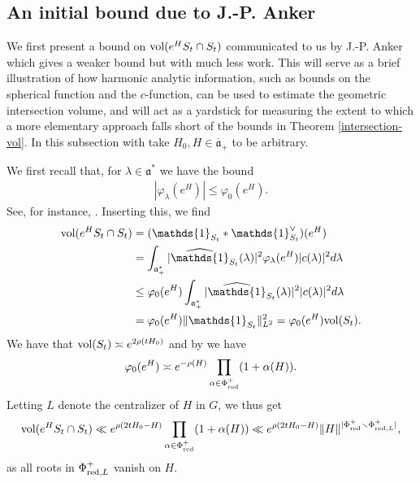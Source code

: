 \documentclass[12pt]{amsart}
\theoremstyle{remark}
\newcommand{\ga}{\mathfrak a}
\begin{document}
\subsection{An initial bound due to J.-P. Anker} \label{sub_sec_anker}
We first present a bound on $\textnormal{vol}(e^H S_t \cap S_t)$ communicated to us by J.-P. Anker which gives a weaker bound but with much less work. This will serve as a brief illustration of how harmonic analytic information, such as bounds on the spherical function and the $c$-function, can be used to estimate the geometric intersection volume, and will act as a yardstick for measuring the extent to which a more elementary approach falls short of the bounds in Theorem \ref{intersection-vol}. In this subsection with take $H_0, H \in \overline{\ga}_+$ to be arbitrary. 

We first recall that, for $\lambda \in \mathfrak{a^*}$ we have the bound
\begin{gather*}
    |\varphi_\lambda(e^H)| \leq \varphi_0(e^H). 
\end{gather*}
See, for instance, \cite[Prop. 4.6.1]{Gangolli_Varadarajan_88}. Inserting this, we find
\begin{align*}
    \textnormal{vol}(e^H S_t \cap S_t) &= (\mathds{1}_{S_t} * \mathds{1}_{S_t}^\vee)(e^H) \\
    &= \int_{\ga_+^*} |\widehat{\mathds{1}}_{S_t}(\lambda)|^2 \varphi_\lambda(e^H) |c(\lambda)|^2 d \lambda \\
    & \leq \varphi_0(e^H) \int_{\ga_+^{*}} |\widehat{\mathds{1}}_{S_t}(\lambda)|^2 |c(\lambda)|^2 d \lambda \\
    & = \varphi_0(e^H) \|\mathds{1}_{S_t}\|^2_{L^2} = \varphi_0(e^H) \textnormal{vol}(S_t).
\end{align*}
We have that $\textnormal{vol}(S_t) \asymp e^{2 \rho(t H_0)}$ and by \cite{Anker_87} we have
\begin{gather*}
    \varphi_0(e^H) \asymp e^{-\rho(H)} \prod_{\alpha \in \Phi_{\textnormal{red}}^+} (1 + \alpha(H)).
\end{gather*}
Letting $L$ denote the centralizer of $H$ in $G$, we thus get
\begin{equation}\label{eqn_poly_bound}
    \textnormal{vol}(e^H S_t \cap S_t) \ll e^{\rho(2 t H_0 - H)} \prod_{\alpha \in \Phi_{\textnormal{red}}^+} (1 + \alpha(H)) \ll e^{\rho(2 t H_0 - H)} \| H \|^{|\Phi_{\textnormal{red}}^+ \smallsetminus \Phi_{\textnormal{red}, L}^+|},
\end{equation}
as all roots in $\Phi_{\textnormal{red}, L}^+$ vanish on $H$.  
\end{document}

